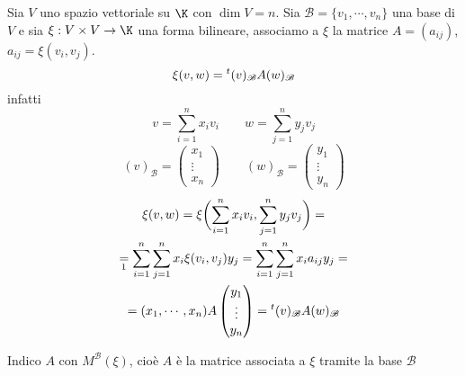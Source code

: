 Sia $ V $ uno spazio vettoriale su $ \K $ con $ \dim  V =n $. Sia $ \mathscr{B}=\{v_1, \cdots, v_{n} \} $ una base di $ V  $ e sia $ \xi:V\times V\to \K $ una forma bilineare, associamo a $ \xi $ la matrice $ A=(a_{ij} ) $, $ a_{ij}=\xi(v_i, v_j)  $. \begin{equation*}
    \xi(v,w)=\null^{t}(v)_{ \mathscr{B}} A (w)_{ \mathscr{B}}
\end{equation*} infatti \[
    v=\sum_{i=1}^{n}x_{i}v_{i}\qquad w=\sum_{j=1}^{n}y_{j}v_{j}      
\] \[
    (v)_{ \mathscr{B}}=\begin{pmatrix}
        x_1\\ \vdots\\ x_{n} 
    \end{pmatrix}\qquad(w)_{ \mathscr{B}}=\begin{pmatrix}
        y_1\\ \vdots\\ y_{n} 
    \end{pmatrix}
\]
\begin{multline*}
    \xi(v,w)=\xi\biggl(\sum_{i=1}^{n}x_{i}v_{i}, \sum_{j=1}^{n}y_{j}v_{j}\biggr)=\\
    \underset{\footnotemark}{=} \sum_{i=1}^{n}\sum_{j=1}^{n} x_{i}\xi(v_{i}, v_{j}  ) y_{j}=   \sum_{i=1}^{n}\sum_{j=1}^{n} x_{i}a_{ij} y_{j}=\\
    =(x_1, \cdots, x_{n} )A \begin{pmatrix}
        y_1\\ \vdots \\ y_{n}
    \end{pmatrix}= \null^{t}(v)_{ \mathscr{B}}A (w)_{ \mathscr{B}} 
\end{multline*}

Indico $ A $ con $ M^{ \mathscr{B}}(\xi) $, cioè $ A $ è la matrice associata a $ \xi $ tramite la base $ \mathscr{B} $


